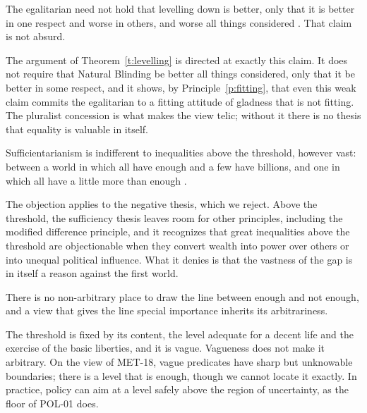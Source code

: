 \documentclass{situationist-preprint}
\begin{document}
\begin{objection}
The egalitarian need not hold that levelling down is better, only that it is better in one respect and worse in others, and worse all things considered \citep{Temkin1993}. That claim is not absurd.
\end{objection}

\begin{reply}
The argument of Theorem~\ref{t:levelling} is directed at exactly this claim. It does not require that Natural Blinding be better all things considered, only that it be better in some respect, and it shows, by Principle~\ref{p:fitting}, that even this weak claim commits the egalitarian to a fitting attitude of gladness that is not fitting. The pluralist concession is what makes the view telic; without it there is no thesis that equality is valuable in itself.
\end{reply}

\begin{objection}
Sufficientarianism is indifferent to inequalities above the threshold, however vast: between a world in which all have enough and a few have billions, and one in which all have a little more than enough \citep{Casal2007}.
\end{objection}

\begin{reply}
The objection applies to the negative thesis, which we reject. Above the threshold, the sufficiency thesis leaves room for other principles, including the modified difference principle, and it recognizes that great inequalities above the threshold are objectionable when they convert wealth into power over others or into unequal political influence. What it denies is that the vastness of the gap is in itself a reason against the first world.
\end{reply}

\begin{objection}
There is no non-arbitrary place to draw the line between enough and not enough, and a view that gives the line special importance inherits its arbitrariness.
\end{objection}

\begin{reply}
The threshold is fixed by its content, the level adequate for a decent life and the exercise of the basic liberties, and it is vague. Vagueness does not make it arbitrary. On the view of MET-18, vague predicates have sharp but unknowable boundaries; there is a level that is enough, though we cannot locate it exactly. In practice, policy can aim at a level safely above the region of uncertainty, as the floor of POL-01 does.
\end{reply}
\end{document}
